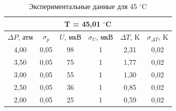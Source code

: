 \documentclass[a4paper, 12pt]{article}
\begin{document}
    \begin{table}[H]
	\centering
        \begin{tabular}{|cccccc|}
            \hline
            \multicolumn{6}{|c|}{T = 45,01 $^\circ$C} \\ \hline
            \multicolumn{1}{|c|}{$\Delta P$, атм} & \multicolumn{1}{c|}{$\sigma_p$} & \multicolumn{1}{c|}{$U$, мкВ} & \multicolumn{1}{c|}{$\sigma_U$, мкВ} & \multicolumn{1}{c|}{$\Delta T$, K} & $\sigma_{\Delta T}$, K \\ \hline
            \multicolumn{1}{|c|}{4,00} & \multicolumn{1}{c|}{0,05} & \multicolumn{1}{c|}{98} & \multicolumn{1}{c|}{1} & \multicolumn{1}{c|}{2,31} & 0,02 \\ \hline
            \multicolumn{1}{|c|}{3,50} & \multicolumn{1}{c|}{0,05} & \multicolumn{1}{c|}{75} & \multicolumn{1}{c|}{1} & \multicolumn{1}{c|}{1,77} & 0,02 \\ \hline
            \multicolumn{1}{|c|}{3,00} & \multicolumn{1}{c|}{0,05} & \multicolumn{1}{c|}{55} & \multicolumn{1}{c|}{1} & \multicolumn{1}{c|}{1,30} & 0,02 \\ \hline
            \multicolumn{1}{|c|}{2,50} & \multicolumn{1}{c|}{0,05} & \multicolumn{1}{c|}{36} & \multicolumn{1}{c|}{1} & \multicolumn{1}{c|}{0,85} & 0,02 \\ \hline
            \multicolumn{1}{|c|}{2,00} & \multicolumn{1}{c|}{0,05} & \multicolumn{1}{c|}{25} & \multicolumn{1}{c|}{1} & \multicolumn{1}{c|}{0,59} & 0,02 \\ \hline
        \end{tabular}
	\caption{Экспериментальные данные для 45 $^\circ$C}
	\label{tab:45C}
    \end{table}
\end{document}
